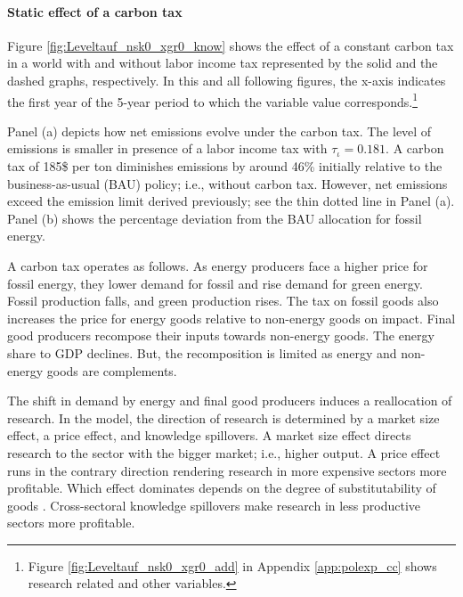 \paragraph{Static effect of a carbon tax}
Figure \ref{fig:Leveltauf_nsk0_xgr0_know} shows the effect of a constant carbon tax in a world with and without labor income tax represented by the solid and the dashed graphs, respectively. In this and all following figures, the x-axis indicates the first year of the 5-year period to which the variable value corresponds.\footnote{ Figure \ref{fig:Leveltauf_nsk0_xgr0_add} in Appendix \ref{app:polexp_cc} shows research related and other variables.}  


Panel (a) depicts how net emissions evolve under the carbon tax. The level of emissions is smaller in presence of a labor income tax with $\tau_{\iota}=0.181$.   A carbon tax of 185\$ per ton diminishes emissions by around 46\% initially relative to the business-as-usual (BAU) policy; i.e., without carbon tax. However, net emissions exceed the emission limit  derived previously; see the thin dotted line in Panel (a). Panel (b) shows the percentage deviation from the BAU allocation for fossil energy.

A carbon tax operates as follows. As energy producers face a higher price for fossil energy, they lower demand for fossil and rise demand for green energy. Fossil production falls, and green production rises.
The tax on fossil goods also increases the price for energy goods relative to non-energy goods on impact. Final good producers recompose their inputs towards non-energy goods. The energy share to GDP declines.  But, the recomposition is limited as energy and non-energy goods are complements. 

The shift in demand by energy and final good producers induces a reallocation of research. In the model, the direction of research is determined by a market size effect, a price effect, and knowledge spillovers. 
A market size effect directs research to the sector with the bigger market; i.e., higher output. A price effect runs in the contrary direction rendering research in more expensive sectors more profitable. Which effect dominates depends on the degree of substitutability of goods \citep{Acemoglu2002DirectedChange, Hemous2021DirectedEconomics}. Cross-sectoral knowledge spillovers make research in less productive sectors more profitable.

